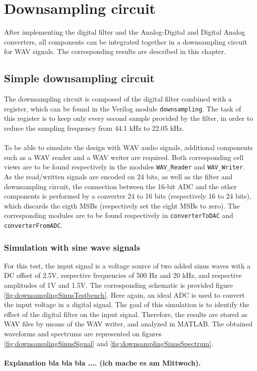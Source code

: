 \chapter{Downsampling circuit}

After implementing the digital filter and the Analog-Digital and Digital Analog converters, all components can be integrated together in a downsampling circuit for WAV signals. The corresponding results are described in this chapter.

\section{Simple downsampling circuit}

The downsampling circuit is composed of the digital filter combined with a register, which can be found in the Verilog module \texttt{downsampling}. The task of this register is to keep only every second sample provided by the filter, in order to reduce the sampling frequency from 44.1 kHz to 22.05 kHz.\\
\\
To be able to simulate the design with WAV audio signals, additional components such as a WAV reader and a WAV writer are required. Both corresponding cell views are to be found respectively in the modules \texttt{WAV\_Reader} and \texttt{WAV\_Writer}. As the read/written signals are encoded on 24 bits, as well as the filter and downsampling circuit, the connection between the 16-bit ADC and the other components is performed by a converter 24 to 16 bits (respectively 16 to 24 bits), which discards the eigth MSBs (respectively set the eight MSBs to zero). The corresponding modules are to be found respectively in \texttt{converterToDAC} and \texttt{converterFromADC}. 

\subsection{Simulation with sine wave signals}

For this test, the input signal is a voltage source of two added sinus waves with a DC offset of 2.5V, respective frequencies of 500 Hz and 20 kHz, and respective amplitudes of 1V and 1.5V. The corresponding schematic is provided figure \ref{fig:downsamplingSinusTestbench}. Here again, an ideal ADC is used to convert the input voltage in a digital signal. The goal of this simulation is to identify the effect of the digital filter on the input signal. Therefore, the results are stored as WAV files by means of the WAV writer, and analyzed in MATLAB. The obtained waveforms and spectrums are represented on figures \ref{fig:downsamplingSinusSignal} and \ref{fig:downsamplingSinusSpectrum}.\\
\\
\textbf{Explanation bla bla bla .... (ich mache es am Mittwoch).}



